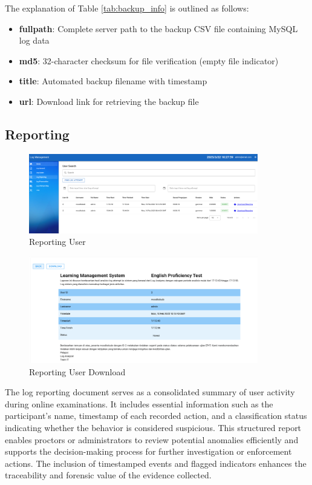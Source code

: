 The explanation of Table \ref{tab:backup_info} is outlined as follows:

\begin{itemize}
	\item \textbf{fullpath}: Complete server path to the backup CSV file containing MySQL log data
	\item \textbf{md5}: 32-character checksum for file verification (empty file indicator)
	\item \textbf{title}: Automated backup filename with timestamp
	\item \textbf{url}: Download link for retrieving the backup file
\end{itemize}

\subsection{Reporting}
\begin{figure}[H] 
	\centering
	\includegraphics[width=10cm]{figure/log_reporting_1.png}
	\caption{Reporting User}
	\label{fig:log_reporting_1}
\end{figure}

\begin{figure}[H] 
	\centering
	\includegraphics[width=10cm]{figure/log_reporting_2.png}
	\caption{Reporting User Download}
	\label{fig:log_reporting_2}
\end{figure}

The log reporting document serves as a consolidated summary of user activity during online examinations. It includes essential information such as the participant's name, timestamp of each recorded action, and a classification status indicating whether the behavior is considered suspicious. This structured report enables proctors or administrators to review potential anomalies efficiently and supports the decision-making process for further investigation or enforcement actions. The inclusion of timestamped events and flagged indicators enhances the traceability and forensic value of the evidence collected.


